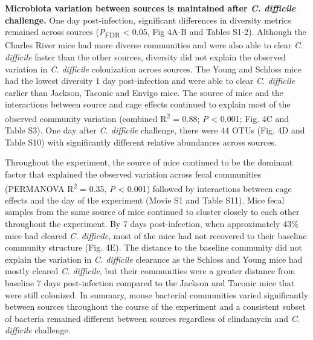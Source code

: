 \documentclass[
  11pt,
]{article}
\begin{document}
\textbf{Microbiota variation between sources is maintained after
\emph{C. difficile} challenge.} One day post-infection, significant
differences in diversity metrics remained across sources
(\emph{P}\textsubscript{FDR} \textless{} 0.05, Fig 4A-B and Tables
S1-2). Although the Charles River mice had more diverse communities and
were also able to clear \emph{C. difficile} faster than the other
sources, diversity did not explain the observed variation in \emph{C.
difficile} colonization across sources. The Young and Schloss mice had
the lowest diversity 1 day post-infection and were able to clear
\emph{C. difficile} earlier than Jackson, Taconic and Envigo mice. The
source of mice and the interactions between source and cage effects
continued to explain most of the observed community variation (combined
R\textsuperscript{2} = 0.88; \emph{P} \textless{} 0.001; Fig. 4C and
Table S3). One day after \emph{C. difficile} challenge, there were 44
OTUs (Fig. 4D and Table S10) with significantly different relative
abundances across sources.

Throughout the experiment, the source of mice continued to be the
dominant factor that explained the observed variation across fecal
communities (PERMANOVA R\textsuperscript{2} = 0.35, \emph{P} \textless{}
0.001) followed by interactions between cage effects and the day of the
experiment (Movie S1 and Table S11). Mice fecal samples from the same
source of mice continued to cluster closely to each other throughout the
experiment. By 7 days post-infection, when approximately 43\% mice had
cleared \emph{C. difficile}, most of the mice had not recovered to their
baseline community structure (Fig. 4E). The distance to the baseline
community did not explain the variation in \emph{C. difficile} clearance
as the Schloss and Young mice had mostly cleared \emph{C. difficile},
but their communities were a greater distance from baseline 7 days
post-infection compared to the Jackson and Taconic mice that were still
colonized. In summary, mouse bacterial communities varied significantly
between sources throughout the course of the experiment and a consistent
subset of bacteria remained different between sources regardless of
clindamycin and \emph{C. difficile} challenge.
\end{document}
